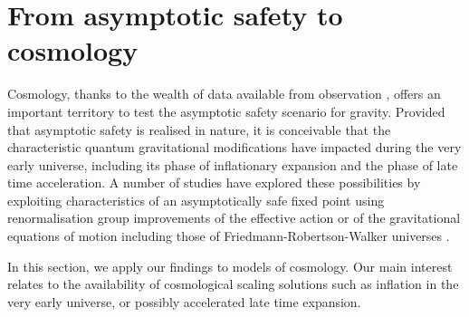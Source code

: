 \documentclass[notitlepage,eqsecnum,bm,amsmath,preprintnumbers,superscriptaddress,nofootinbib,aps,11pt]{revtex4-1}
\begin{document}
\section{\bf From asymptotic safety to cosmology}\label{sec:cosmology}

Cosmology, thanks to the wealth of data available from observation \cite{Ade:2013uln,Ade:2013zuv,Perlmutter:1998np}, offers an important territory to test the asymptotic safety scenario for gravity. Provided that asymptotic safety is realised in nature, it is conceivable that the characteristic quantum gravitational modifications  have impacted during the very early universe,  including its phase of inflationary expansion and the phase of  late time acceleration. A number of studies have explored  these possibilities 
by exploiting characteristics of an asymptotically safe fixed point using renormalisation group improvements of the effective action or of the gravitational equations of motion including those of Friedmann-Robertson-Walker universes \cite{Shapiro:2000dz,Weinberg:2009wa,Reuter:2005kb,Bonanno:2001xi,Bonanno:2001hi,
Bonanno:2009nj,Bonanno:2010bt,Koch:2010nn,Bonanno:2012jy,Frolov:2011ys,Cai:2011kd,
Contillo:2011ag,Hindmarsh:2011hx,Ahn:2011qt,Hindmarsh:2012rc,Copeland:2013vva,
Kaya:2013bga,Saltas:2015vsc, Bonanno:2015fga,Kofinas:2016lcz}.


In this section, we apply our findings to models of cosmology. Our main interest relates to the availability of cosmological scaling solutions such as inflation in the very early universe, or possibly accelerated late time expansion.
\end{document}
